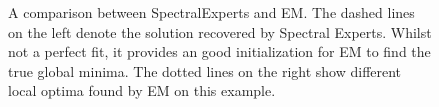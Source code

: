 \begin{figure}[t]
  \centering
    \hspace{-2em}
    \hspace{-2em}
  \caption{A comparison between SpectralExperts and EM. The dashed lines
  on the left denote the solution recovered by Spectral Experts. Whilst
  not a perfect fit, it provides an good initialization for EM to find
  the true global minima. The dotted lines on the right show different
  local optima found by EM on this example.}
  \label{fig:curves}
\end{figure}


